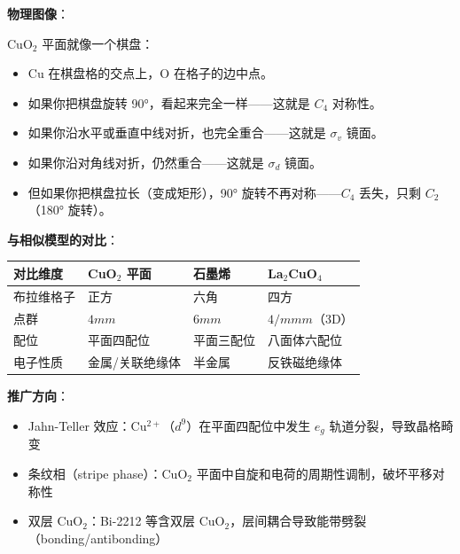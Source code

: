 \begin{insightbox}[物理图像与模型关联]
\textbf{物理图像}：

CuO$_2$ 平面就像一个棋盘：
\begin{itemize}[nosep]
    \item Cu 在棋盘格的交点上，O 在格子的边中点。
    \item 如果你把棋盘旋转 90°，看起来完全一样——这就是 $C_4$ 对称性。
    \item 如果你沿水平或垂直中线对折，也完全重合——这就是 $\sigma_v$ 镜面。
    \item 如果你沿对角线对折，仍然重合——这就是 $\sigma_d$ 镜面。
    \item 但如果你把棋盘拉长（变成矩形），90° 旋转不再对称——$C_4$ 丢失，只剩 $C_2$（180° 旋转）。
\end{itemize}

\textbf{与相似模型的对比}：
\begin{center}
\begin{tabular}{llll}
\toprule
\textbf{对比维度} & \textbf{CuO$_2$ 平面} & \textbf{石墨烯} & \textbf{La$_2$CuO$_4$} \\
\midrule
布拉维格子 & 正方 & 六角 & 四方 \\
点群 & $4mm$ & $6mm$ & $4/mmm$（3D） \\
配位 & 平面四配位 & 平面三配位 & 八面体六配位 \\
电子性质 & 金属/关联绝缘体 & 半金属 & 反铁磁绝缘体 \\
\bottomrule
\end{tabular}
\end{center}

\textbf{推广方向}：
\begin{itemize}[nosep]
    \item Jahn-Teller 效应：Cu$^{2+}$（$d^9$）在平面四配位中发生 $e_g$ 轨道分裂，导致晶格畸变
    \item 条纹相（stripe phase）：CuO$_2$ 平面中自旋和电荷的周期性调制，破坏平移对称性
    \item 双层 CuO$_2$：Bi-2212 等含双层 CuO$_2$，层间耦合导致能带劈裂（bonding/antibonding）
\end{itemize}
\end{insightbox}

